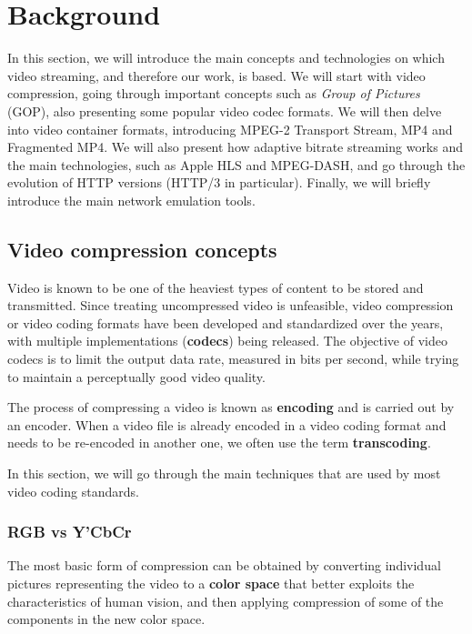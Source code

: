 \chapter{Background}
\label{cha:bg}

In this section, we will introduce the main concepts and technologies on which video streaming, and therefore our work, is based. We will start with video compression, going through important concepts such as \textit{Group of Pictures} (GOP), also presenting some popular video codec formats. We will then delve into video container formats, introducing MPEG-2 Transport Stream, MP4 and Fragmented MP4. We will also present how adaptive bitrate streaming works and the main technologies, such as Apple HLS and MPEG-DASH, and go through the evolution of HTTP versions (HTTP/3 in particular). Finally, we will briefly introduce the main network emulation tools.

\section{Video compression concepts}
\label{sec:bg/compression}

Video is known to be one of the heaviest types of content to be stored and transmitted. Since treating uncompressed video is unfeasible, video compression or video coding formats have been developed and standardized over the years, with multiple implementations (\textbf{codecs}) being released. The objective of video codecs is to limit the output data rate, measured in bits per second, while trying to maintain a perceptually good video quality.

The process of compressing a video is known as \textbf{encoding} and is carried out by an encoder. When a video file is already encoded in a video coding format and needs to be re-encoded in another one, we often use the term \textbf{transcoding}.

In this section, we will go through the main techniques that are used by most video coding standards.

\subsection{RGB vs Y'CbCr}
\label{sec:bg/compression/ycbcr}

The most basic form of compression can be obtained by converting individual pictures representing the video to a \textbf{color space} that better exploits the characteristics of human vision, and then applying compression of some of the components in the new color space.

